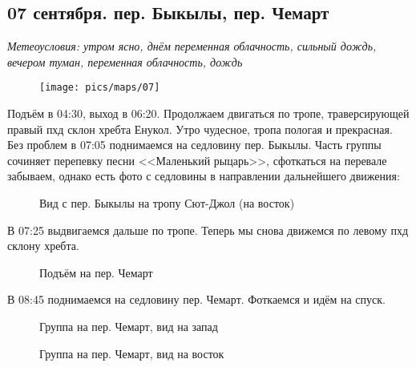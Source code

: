 \subsection{07 сентября. пер. Быкылы, пер. Чемарт}
\textit{Метеоусловия: утром ясно, днём переменная облачность, сильный дождь, вечером туман, переменная облачность, дождь}

\begin{figure}[h!]
	\centering
	\texttt{[image: pics/maps/07]}
	\label{fig:07}
\end{figure}

Подъём в 04:30, выход в 06:20. Продолжаем двигаться по тропе, траверсирующей правый пхд склон хребта Енукол. Утро чудесное, тропа пологая и прекрасная. Без проблем в 07:05 поднимаемся на седловину пер. Быкылы. Часть группы сочиняет перепевку песни <<Маленький рыцарь>>, сфоткаться на перевале забываем, однако есть фото с седловины в направлении дальнейшего движения:

\begin{figure}[h!]
	\centering
	\caption{Вид с пер. Быкылы на тропу Сют-Джол (на восток)}
	\label{fig:bykyly}
\end{figure}


В 07:25 выдвигаемся дальше по тропе. Теперь мы снова движемся по левому пхд склону хребта.

\begin{figure}[h!]
	\centering
	\caption{Подъём на пер. Чемарт}
	\label{fig:toward_chemart}
\end{figure}

В 08:45 поднимаемся на седловину пер. Чемарт. Фоткаемся и идём на спуск.

\begin{figure}[h!]
	\centering
	\caption{Группа на пер. Чемарт, вид на запад}
	\label{fig:chemart_west}
\end{figure}


\begin{figure}[h!]
	\centering
	\caption{Группа на пер. Чемарт, вид на восток}
	\label{fig:chemart_east}
\end{figure}


